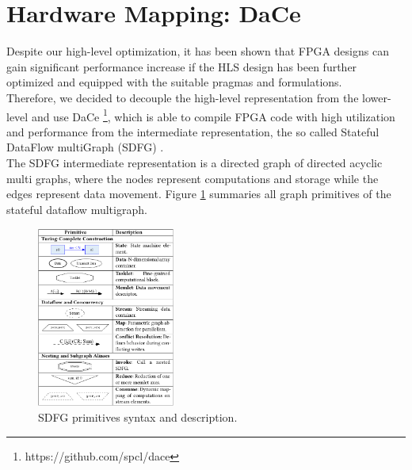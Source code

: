 \section{Hardware Mapping: DaCe}
Despite our high-level optimization, it has been shown that FPGA designs can gain significant performance increase \cite{label57} if the HLS design has been further optimized and equipped with the suitable pragmas and formulations. \\
Therefore, we decided to decouple the high-level representation from the lower-level and use DaCe \footnote{https://github.com/spcl/dace}, which is able to compile FPGA code with high utilization and performance from the intermediate representation, the so called Stateful DataFlow multiGraph (SDFG) \cite{label57}. \\
The SDFG intermediate representation is a directed graph of directed acyclic multi graphs, where the nodes represent computations and storage while the edges represent data movement. Figure \ref{fig:dace-sdft-syntax} summaries all graph primitives of the stateful dataflow multigraph. \\ 
\begin{figure}[h]
	\centering
	\includegraphics[height=16em]{images/dace-sdft-syntax.png}
	\caption{SDFG primitives syntax and description. \cite{label57}}
	\label{fig:dace-sdft-syntax}
\end{figure}


